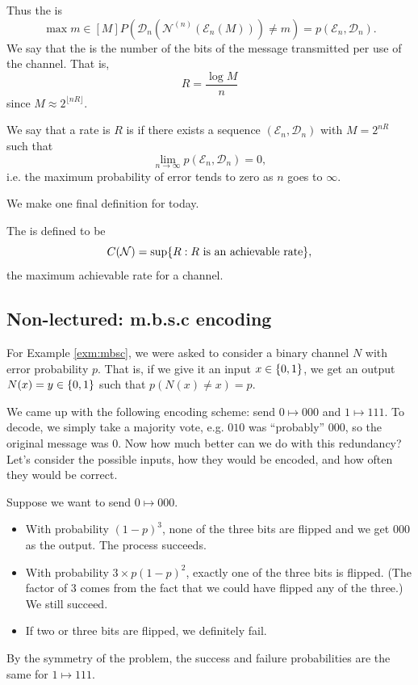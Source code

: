 Thus the  is
\begin{equation}
    \max{m\in [M]} P(\mathcal{D}_n(\mathcal{N}^{(n)}(\mathcal{E}_n(M))) \neq m) = p(\mathcal{E}_n,\mathcal{D}_n).
\end{equation}
We say that the  is the number of the bits of the message transmitted per use of the channel. That is,
\begin{equation}
    R= \frac{\log M}{n}
\end{equation}
since $M \approx 2^{\lfloor nR \rfloor}.$

\begin{defn}
    We say that a rate is $R$ is  if there exists a sequence $(\mathcal{E}_n, \mathcal{D}_n)$ with $M=2^{nR}$ such that
    \begin{equation}
        \lim_{n\to \infty} p(\mathcal{E}_n,\mathcal{D}_n)= 0,
    \end{equation}
    i.e. the maximum probability of error tends to zero as $n$ goes to $\infty$.
\end{defn}

We make one final definition for today.
\begin{defn}
    The  is defined to be
    \begin{equation}
        C(\mathcal{N})=\sup \{R: R\text{ is an achievable rate}\},
    \end{equation}
    the maximum achievable rate for a channel.
\end{defn}

\subsection*{Non-lectured: m.b.s.c encoding}

For Example \ref{exm:mbsc}, we were asked to consider a binary channel $N$ with error probability $p$. That is, if we give it an input $x\in \{0,1\}$, we get an output $N(x)=y\in \{0,1\}$ such that $p(N(x)\neq x)=p$.

We came up with the following encoding scheme: send $0\mapsto 000$ and $1\mapsto 111$. To decode, we simply take a majority vote, e.g. $010$ was ``probably'' $000$, so the original message was $0$. Now how much better can we do with this redundancy? Let's consider the possible inputs, how they would be encoded, and how often they would be correct.

Suppose we want to send $0\mapsto 000$.
\begin{itemize}
    \item With probability $(1-p)^3$, none of the three bits are flipped and we get $000$ as the output. The process succeeds.
    \item With probability $3\times p(1-p)^2$, exactly one of the three bits is flipped. (The factor of $3$ comes from the fact that we could have flipped any of the three.) We still succeed.
    \item If two or three bits are flipped, we definitely fail.
\end{itemize}
By the symmetry of the problem, the success and failure probabilities are the same for $1\mapsto 111$.

